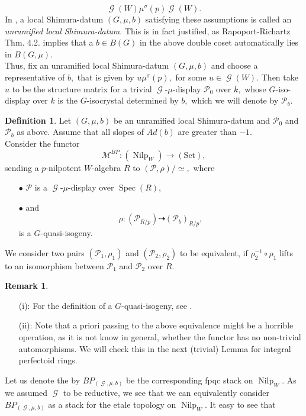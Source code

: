 \documentclass[a4paper,10,5 pt]{amsart}
\theoremstyle{definition}
\newtheorem{Definition}{Definition}
\newtheorem{Remark}{Remark}
\DeclareMathOperator{\Spec}{Spec}
\DeclareMathOperator{\Nilp}{Nilp}
\DeclareMathOperator{\G}{\mathcal{G}}
\begin{document}
$$
\G(W)\mu^{\sigma}(p)\G(W).
$$
In \cite{BP}, a local Shimura-datum $(G,\mu,b)$ satisfying these assumptions is called an \textit{unramified local Shimura-datum}. This is in fact justified, as Rapoport-Richartz Thm. 4.2. implies that a $b\in B(G)$ in the above double coset automatically lies in $B(G,\mu).$
\\
Thus, fix an unramified local Shimura-datum $(G,\mu,b)$ and choose a representative of $b,$ that is given by $u\mu^{\sigma}(p),$ for some $u\in \G(W).$ Then take $u$ to be the structure matrix for a trivial $\G$-$\mu$-display $\mathcal{P}_{0}$ over $k,$ whose $G$-iso-display over $k$ is the $G$-isocrystal determined by $b,$ which we will denote by $\mathcal{P}_{b}.$
\begin{Definition}
Let $(G,\mu,b)$ be an unramified local Shimura-datum and $\mathcal{P}_{0}$ and $\mathcal{P}_{b}$ as above. Assume that all slopes of $Ad(b)$ are greater than $-1.$
\\
Consider the functor
$$
\mathcal{M}^{BP}\colon (\Nilp_{W})\rightarrow (\text{Set}),
$$
sending a $p$-nilpotent $W$-algebra $R$ to $(\mathcal{P},\rho)/\simeq,$ where 
\begin{enumerate}
\item[$\bullet$] $\mathcal{P}$ is a $\G$-$\mu$-display over $\Spec(R),$
\item[$\bullet$] and $$\rho\colon (\mathcal{P}_{R/p})\dashrightarrow (\mathcal{P}_{b})_{R/p},$$ is a $G$-quasi-isogeny.
\end{enumerate}
We consider two pairs $(\mathcal{P}_{1},\rho_{1})$ and $(\mathcal{P}_{2},\rho_{2})$ to be equivalent, if $\rho_{2}^{-1}\circ \rho_{1}$ lifts to an isomorphism between $\mathcal{P}_{1}$ and $\mathcal{P}_{2}$ over $R.$
\end{Definition}
\begin{Remark}
\begin{enumerate}
\item[(i):] For the definition of a $G$-quasi-isogeny, see \cite[Def. 3.3.5.]{BP}.
\item[(ii):] Note that a priori passing to the above equivalence might be a horrible operation, as it is not know in general, whether the functor has no non-trivial automorphisms. We will check this in the next (trivial) Lemma for integral perfectoid rings.
\end{enumerate}
\end{Remark}
Let us denote the by $BP_{(\G,\mu,b)}$ be the corresponding fpqc stack on $\Nilp_{W}.$ As we assumed $\G$ to be reductive, we see that we can equivalently consider  $BP_{(\G,\mu,b)}$ as a stack for the etale topology on $\Nilp_{W}.$ It easy to see that
\end{document}
